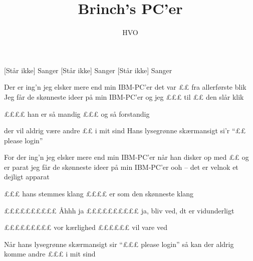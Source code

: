 \documentclass[a4paper,11pt]{article}
\title{Brinch's PC'er}
\author{HVO}
\begin{document}
\maketitle

\begin{roles}
[Står ikke] Sanger
[Står ikke] Sanger
[Står ikke] Sanger

\end{roles}


\begin{song}
%
Der er ing'n jeg elsker mere
end min IBM-PC'er
det var ££ fra allerførste blik
Jeg får de skønneste ideer
på min IBM-PC'er
og jeg £££ til ££ den slår klik

%
££££ han er så mandig
£££ og så forstandig

%
der vil aldrig være andre
££ i mit sind
Hans lysegrønne skærmansigt
si'r ``££ please login''

%
For der ing'n jeg elsker mere
end min IBM-PC'er
når han disker op med ££ og er parat
jeg får de skønneste ideer
på min IBM-PC'er
ooh -- det er velnok et dejligt apparat

%
£££ hans stemmes klang
££££ er som den skønneste klang

%
££££££££££ Åhhh ja 
££££££££££ ja, bliv ved, dt er vidunderligt 

 

%
£££££££££ vor kærlighed
££££££ vil vare ved

%
Når hans lysegrønne skærmansigt
sir ``£££ please login''
så kan der aldrig komme andre
£££ i mit sind

\end{song}
\end{document}
